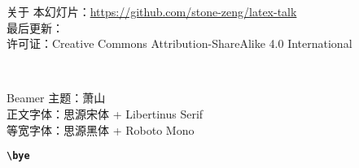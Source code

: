 \begin{frame}{关于}
\vspace*{1.2cm}
\footnotesize
本幻灯片：\url{https://github.com/stone-zeng/latex-talk} \\
最后更新：\DTMnow \\
许可证：Creative Commons Attribution-ShareAlike 4.0 International
\vspace{0.4cm}
\begin{center}
  \huge
  \faCreativeCommons\,\faCreativeCommonsBy\,\faCreativeCommonsSa
\end{center}
\vspace{2cm}
\begin{flushleft}
  \tiny
  Beamer 主题：萧山  \\
  正文字体：思源宋体 + Libertinus Serif \\
  等宽字体：思源黑体 + Roboto Mono
\end{flushleft}
\vspace{-0.5cm}
\end{frame}

\begin{frame}[standout]
  \huge \textbf{\texttt{\textbackslash bye}}
\end{frame}
